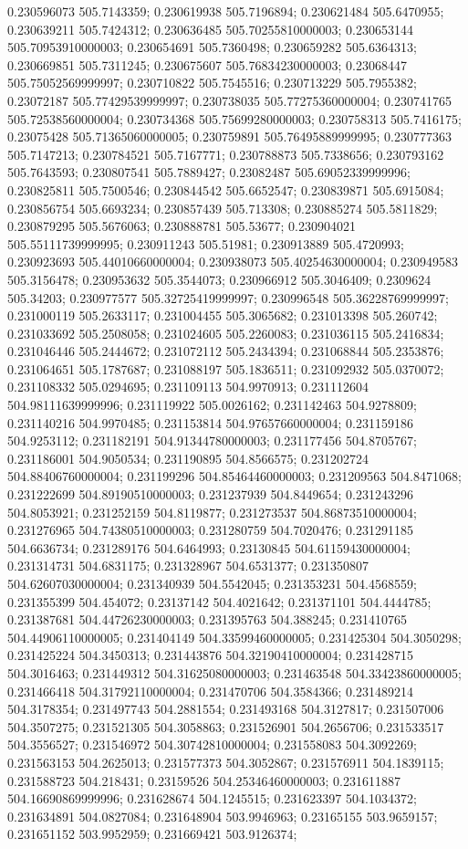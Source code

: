 0.230596073 505.7143359; 0.230619938 505.7196894; 0.230621484 505.6470955; 0.230639211 505.7424312; 0.230636485 505.70255810000003; 0.230653144 505.70953910000003; 0.230654691 505.7360498; 0.230659282 505.6364313; 0.230669851 505.7311245; 0.230675607 505.76834230000003; 0.23068447 505.75052569999997; 0.230710822 505.7545516; 0.230713229 505.7955382; 0.23072187 505.77429539999997; 0.230738035 505.77275360000004; 0.230741765 505.72538560000004; 0.230734368 505.75699280000003; 0.230758313 505.7416175; 0.23075428 505.71365060000005; 0.230759891 505.76495889999995; 0.230777363 505.7147213; 0.230784521 505.7167771; 0.230788873 505.7338656; 0.230793162 505.7643593; 0.230807541 505.7889427; 0.23082487 505.69052339999996; 0.230825811 505.7500546; 0.230844542 505.6652547; 0.230839871 505.6915084; 0.230856754 505.6693234; 0.230857439 505.713308; 0.230885274 505.5811829; 0.230879295 505.5676063; 0.230888781 505.53677; 0.230904021 505.55111739999995; 0.230911243 505.51981; 0.230913889 505.4720993; 0.230923693 505.44010660000004; 0.230938073 505.40254630000004; 0.230949583 505.3156478; 0.230953632 505.3544073; 0.230966912 505.3046409; 0.2309624 505.34203; 0.230977577 505.32725419999997; 0.230996548 505.36228769999997; 0.231000119 505.2633117; 0.231004455 505.3065682; 0.231013398 505.260742; 0.231033692 505.2508058; 0.231024605 505.2260083; 0.231036115 505.2416834; 0.231046446 505.2444672; 0.231072112 505.2434394; 0.231068844 505.2353876; 0.231064651 505.1787687; 0.231088197 505.1836511; 0.231092932 505.0370072; 0.231108332 505.0294695; 0.231109113 504.9970913; 0.231112604 504.98111639999996; 0.231119922 505.0026162; 0.231142463 504.9278809; 0.231140216 504.9970485; 0.231153814 504.97657660000004; 0.231159186 504.9253112; 0.231182191 504.91344780000003; 0.231177456 504.8705767; 0.231186001 504.9050534; 0.231190895 504.8566575; 0.231202724 504.88406760000004; 0.231199296 504.85464460000003; 0.231209563 504.8471068; 0.231222699 504.89190510000003; 0.231237939 504.8449654; 0.231243296 504.8053921; 0.231252159 504.8119877; 0.231273537 504.86873510000004; 0.231276965 504.74380510000003; 0.231280759 504.7020476; 0.231291185 504.6636734; 0.231289176 504.6464993; 0.23130845 504.61159430000004; 0.231314731 504.6831175; 0.231328967 504.6531377; 0.231350807 504.62607030000004; 0.231340939 504.5542045; 0.231353231 504.4568559; 0.231355399 504.454072; 0.23137142 504.4021642; 0.231371101 504.4444785; 0.231387681 504.44726230000003; 0.231395763 504.388245; 0.231410765 504.44906110000005; 0.231404149 504.33599460000005; 0.231425304 504.3050298; 0.231425224 504.3450313; 0.231443876 504.32190410000004; 0.231428715 504.3016463; 0.231449312 504.31625080000003; 0.231463548 504.33423860000005; 0.231466418 504.31792110000004; 0.231470706 504.3584366; 0.231489214 504.3178354; 0.231497743 504.2881554; 0.231493168 504.3127817; 0.231507006 504.3507275; 0.231521305 504.3058863; 0.231526901 504.2656706; 0.231533517 504.3556527; 0.231546972 504.30742810000004; 0.231558083 504.3092269; 0.231563153 504.2625013; 0.231577373 504.3052867; 0.231576911 504.1839115; 0.231588723 504.218431; 0.23159526 504.25346460000003; 0.231611887 504.16690869999996; 0.231628674 504.1245515; 0.231623397 504.1034372; 0.231634891 504.0827084; 0.231648904 503.9946963; 0.23165155 503.9659157; 0.231651152 503.9952959; 0.231669421 503.9126374; 